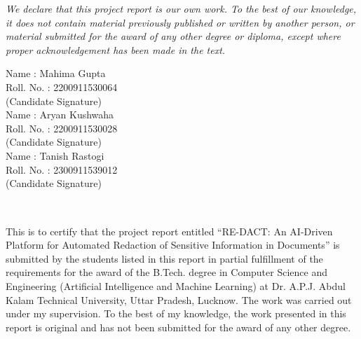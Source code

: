 \begin{center}
\chapter*{}
\end{center}\\

\doublespacing
\textit{We declare that this project report is our own work. To the best of our knowledge, it does not contain material previously published or written by another person, or material submitted for the award of any other degree or diploma, except where proper acknowledgement has been made in the text.}

\begin{flushleft}
Name : Mahima Gupta\\
Roll. No. :   2200911530064\\
\vspace{5mm}
(Candidate Signature) \\
\vspace{5mm}
Name : Aryan Kushwaha\\
Roll. No. :   2200911530028\\
\vspace{5mm}
(Candidate Signature) \\
\vspace{5mm}
Name : Tanish Rastogi\\
Roll. No. :   2300911539012\\
\vspace{5mm}
(Candidate Signature) \\
\vspace{5mm}
\end{flushleft}
\restoregeometry
\newpage
\begin{center}
\chapter*{}
\end{center}\\

\doublespacing
This is to certify that the project report entitled ``RE-DACT: An AI-Driven Platform for Automated Redaction of Sensitive Information in Documents'' is submitted by the students listed in this report in partial fulfillment of the requirements for the award of the B.Tech. degree in Computer Science and Engineering (Artificial Intelligence and Machine Learning) at Dr. A.P.J. Abdul Kalam Technical University, Uttar Pradesh, Lucknow. The work was carried out under my supervision. To the best of my knowledge, the work presented in this report is original and has not been submitted for the award of any other degree.


